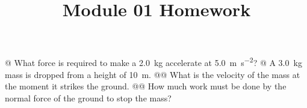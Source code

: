 \documentclass[letterpaper,10pt]{article}
\title{ Module 01 Homework }
\author{  }
\date{  }
\begin{document}
\maketitle

\begin{easylist}
@ \label{139913891836496}What force is required to make a \SI{2.0}{\kilo\gram} accelerate at \SI{5.0}{\meter\per\second\squared}?
@ \label{139913891836368}A \SI{3.0}{\kilo\gram} mass is dropped from a height of \SI{10}{\meter}.
@@ \label{139913891836944}What is the velocity of the mass at the moment it strikes the ground.
@@ \label{139913891837136}How much work must be done by the normal force of the ground to stop the mass?
\end{easylist}



\clearpage
\end{document}
